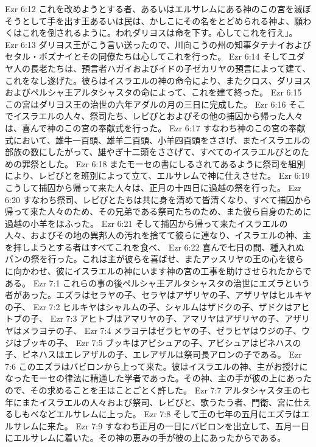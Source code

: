 Ezr 6:12  これを改めようとする者、あるいはエルサレムにある神のこの宮を滅ぼそうとして手を出す王あるいは民は、かしこにその名をとどめられる神よ、願わくはこれを倒されるように。われダリヨスは命を下す。心してこれを行え」。
Ezr 6:13  ダリヨス王がこう言い送ったので、川向こうの州の知事タテナイおよびセタル・ボズナイとその同僚たちは心してこれを行った。
Ezr 6:14  そしてユダヤ人の長老たちは、預言者ハガイおよびイドの子ゼカリヤの預言によって建て、これをなし遂げた。彼らはイスラエルの神の命令により、またクロス、ダリヨスおよびペルシャ王アルタシャスタの命によって、これを建て終った。
Ezr 6:15  この宮はダリヨス王の治世の六年アダルの月の三日に完成した。
Ezr 6:16  そこでイスラエルの人々、祭司たち、レビびとおよびその他の捕囚から帰った人々は、喜んで神のこの宮の奉献式を行った。
Ezr 6:17  すなわち神のこの宮の奉献式において、雄牛一百頭、雄羊二百頭、小羊四百頭をささげ、またイスラエルの部族の数にしたがって、雄やぎ十二頭をささげて、すべてのイスラエルびとのための罪祭とした。
Ezr 6:18  またモーセの書にしるされてあるように祭司を組別により、レビびとを班別によって立て、エルサレムで神に仕えさせた。
Ezr 6:19  こうして捕囚から帰って来た人々は、正月の十四日に過越の祭を行った。
Ezr 6:20  すなわち祭司、レビびとたちは共に身を清めて皆清くなり、すべて捕囚から帰って来た人々のため、その兄弟である祭司たちのため、また彼ら自身のために過越の小羊をほふった。
Ezr 6:21  そして捕囚から帰って来たイスラエルの人々、およびその地の異邦人の汚れを捨てて彼らに連なり、イスラエルの神、主を拝しようとする者はすべてこれを食べ、
Ezr 6:22  喜んで七日の間、種入れぬパンの祭を行った。これは主が彼らを喜ばせ、またアッスリヤの王の心を彼らに向かわせ、彼にイスラエルの神にいます神の宮の工事を助けさせられたからである。
Ezr 7:1  これらの事の後ペルシャ王アルタシャスタの治世にエズラという者があった。エズラはセラヤの子、セラヤはアザリヤの子、アザリヤはヒルキヤの子、
Ezr 7:2  ヒルキヤはシャルムの子、シャルムはザドクの子、ザドクはアヒトブの子、
Ezr 7:3  アヒトブはアマリヤの子、アマリヤはアザリヤの子、アザリヤはメラヨテの子、
Ezr 7:4  メラヨテはゼラヒヤの子、ゼラヒヤはウジの子、ウジはブッキの子、
Ezr 7:5  ブッキはアビシュアの子、アビシュアはピネハスの子、ピネハスはエレアザルの子、エレアザルは祭司長アロンの子である。
Ezr 7:6  このエズラはバビロンから上って来た。彼はイスラエルの神、主がお授けになったモーセの律法に精通した学者であった。その神、主の手が彼の上にあったので、その求めることを王はことごとく許した。
Ezr 7:7  アルタシャスタ王の七年にまたイスラエルの人々および祭司、レビびと、歌うたう者、門衛、宮に仕えるしもべなどエルサレムに上った。
Ezr 7:8  そして王の七年の五月にエズラはエルサレムに来た。
Ezr 7:9  すなわち正月の一日にバビロンを出立して、五月一日にエルサレムに着いた。その神の恵みの手が彼の上にあったからである。
